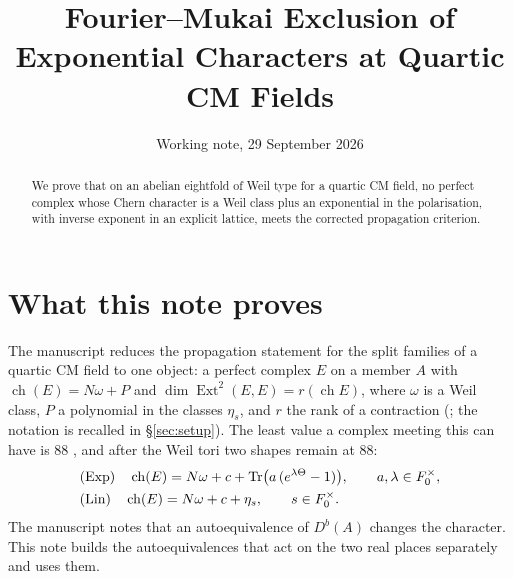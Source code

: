 \documentclass[11pt]{amsart}
\title{Fourier--Mukai Exclusion of Exponential Characters at Quartic CM Fields}
\date{Working note, 29 September 2026}
\theoremstyle{definition}
\theoremstyle{remark}
\newcommand{\ch}{\operatorname{ch}}
\newcommand{\Ext}{\operatorname{Ext}}
\newcommand{\Tr}{\operatorname{Tr}}
\begin{document}
\begin{abstract}
We prove that on an abelian eightfold of Weil type for a quartic CM field, no
perfect complex whose Chern character is a Weil class plus an exponential in
the polarisation, with inverse exponent in an explicit lattice, meets the
corrected propagation criterion.
\end{abstract}

\maketitle

\section{What this note proves}\label{sec:status}

The manuscript \cite{BMB} reduces the propagation statement for the split
families of a quartic CM field to one object: a perfect complex $E$ on a
member $A$ with $\ch(E)=N\omega+P$ and $\dim\Ext^{2}(E,E)=r(\ch E)$, where
$\omega$ is a Weil class, $P$ a polynomial in the classes $\eta_{s}$, and
$r$ the rank of a contraction (\cite[Theorem~19.21(v)]{BMB}; the notation is
recalled in \S\ref{sec:setup}). The least value a complex meeting this can
have is $88$ \cite[Corollary~19.23]{BMB}, and after the Weil tori
\cite[Proposition~19.24, Corollary~19.26]{BMB} two shapes remain at $88$:
\begin{align*}
  &\textup{(Exp)}\quad \ch(E)=N\omega+c+\Tr\bigl(a\,(e^{\lambda\Theta}-1)\bigr),
    \qquad a,\lambda\in F_{0}^{\times},\\
  &\textup{(Lin)}\quad \ch(E)=N\omega+c+\eta_{s},
    \qquad s\in F_{0}^{\times}.
\end{align*}
The manuscript notes that an autoequivalence of $D^{b}(A)$ changes the
character. This note builds the autoequivalences that act on the two real
places separately and uses them.
\end{document}
